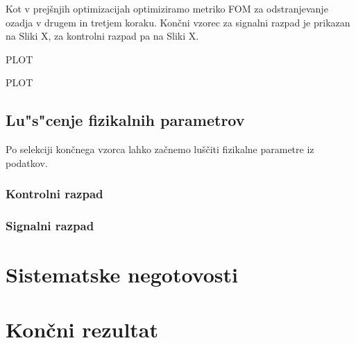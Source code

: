 \begin{otherlanguage}{slovene}
Kot v prejšnjih optimizacijah optimiziramo metriko FOM za odstranjevanje ozadja v drugem in tretjem koraku. Končni vzorec za signalni razpad je prikazan na Sliki X, za kontrolni razpad pa na Sliki X.

PLOT 

PLOT

\subsection{Lu"s"cenje fizikalnih parametrov}

Po selekciji končnega vzorca lahko začnemo luščiti fizikalne parametre iz podatkov.

\subsubsection{Kontrolni razpad}

\subsubsection{Signalni razpad}

\section{Sistematske negotovosti}

\section{Kon\v cni rezultat}

\end{otherlanguage}
